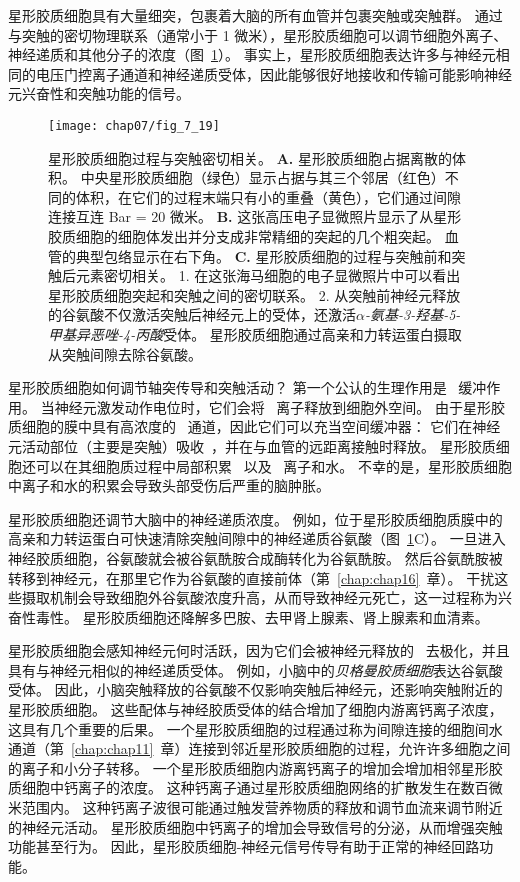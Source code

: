 星形胶质细胞具有大量细突，包裹着大脑的所有血管并包裹突触或突触群。
通过与突触的密切物理联系（通常小于 1 微米），星形胶质细胞可以调节细胞外离子、神经递质和其他分子的浓度（图~\ref{fig:7_19}）。
事实上，星形胶质细胞表达许多与神经元相同的电压门控离子通道和神经递质受体，因此能够很好地接收和传输可能影响神经元兴奋性和突触功能的信号。


\begin{figure}[htbp]
	\centering
	\texttt{[image: chap07/fig\_7\_19]}
	\caption{星形胶质细胞过程与突触密切相关。
		\textbf{A.} 星形胶质细胞占据离散的体积。
		中央星形胶质细胞（绿色）显示占据与其三个邻居（红色）不同的体积，在它们的过程末端只有小的重叠（黄色），它们通过间隙连接互连 Bar = 20 微米\cite{bushong2002protoplasmic}。
		\textbf{B.} 这张高压电子显微照片显示了从星形胶质细胞的细胞体发出并分支成非常精细的突起的几个粗突起。
		血管的典型包络显示在右下角\cite{hama1994three}。
		\textbf{C.} 星形胶质细胞的过程与突触前和突触后元素密切相关。
		1. 在这张海马细胞的电子显微照片中可以看出星形胶质细胞突起和突触之间的密切联系\cite{ventura1999three}。
		2. 从突触前神经元释放的谷氨酸不仅激活突触后神经元上的受体，还激活\textit{$\alpha$-氨基-3-羟基-5-甲基异恶唑-4-丙酸}受体。
		星形胶质细胞通过高亲和力转运蛋白摄取从突触间隙去除谷氨酸\cite{gallo2001unwrapping}。}
	\label{fig:7_19}
\end{figure}


星形胶质细胞如何调节轴突传导和突触活动？
第一个公认的生理作用是~ 缓冲作用。
当神经元激发动作电位时，它们会将~ 离子释放到细胞外空间。
由于星形胶质细胞的膜中具有高浓度的~ 通道，因此它们可以充当空间缓冲器：
它们在神经元活动部位（主要是突触）吸收~，并在与血管的远距离接触时释放。
星形胶质细胞还可以在其细胞质过程中局部积累~ 以及~ 离子和水。
不幸的是，星形胶质细胞中离子和水的积累会导致头部受伤后严重的脑肿胀。


星形胶质细胞还调节大脑中的神经递质浓度。
例如，位于星形胶质细胞质膜中的高亲和力转运蛋白可快速清除突触间隙中的神经递质谷氨酸（图~\ref{fig:7_19}C）。
一旦进入神经胶质细胞，谷氨酸就会被谷氨酰胺合成酶转化为谷氨酰胺。
然后谷氨酰胺被转移到神经元，在那里它作为谷氨酸的直接前体（第~\ref{chap:chap16}~章）。
干扰这些摄取机制会导致细胞外谷氨酸浓度升高，从而导致神经元死亡，这一过程称为兴奋性毒性。
星形胶质细胞还降解多巴胺、去甲肾上腺素、肾上腺素和血清素。


星形胶质细胞会感知神经元何时活跃，因为它们会被神经元释放的~ 去极化，并且具有与神经元相似的神经递质受体。
例如，小脑中的\textit{贝格曼胶质细胞}表达谷氨酸受体。
因此，小脑突触释放的谷氨酸不仅影响突触后神经元，还影响突触附近的星形胶质细胞。
这些配体与神经胶质受体的结合增加了细胞内游离钙离子浓度，这具有几个重要的后果。
一个星形胶质细胞的过程通过称为间隙连接的细胞间水通道（第~\ref{chap:chap11}~章）连接到邻近星形胶质细胞的过程，允许许多细胞之间的离子和小分子转移。 
一个星形胶质细胞内游离钙离子的增加会增加相邻星形胶质细胞中钙离子的浓度。
这种钙离子通过星形胶质细胞网络的扩散发生在数百微米范围内。
这种钙离子波很可能通过触发营养物质的释放和调节血流来调节附近的神经元活动。
星形胶质细胞中钙离子的增加会导致信号的分泌，从而增强突触功能甚至行为。
因此，星形胶质细胞-神经元信号传导有助于正常的神经回路功能。


